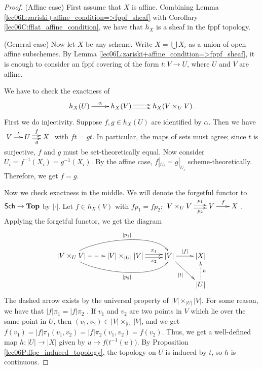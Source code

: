 \begin{proof}
  (Affine case) First assume that $X$ is affine. Combining Lemma
  \ref{lec06L:zariski+affine_condition=>fppf_sheaf} with Corollary
  \ref{lec06C:fflat_affine_condition}, we have that $h_X$ is a sheaf in the fppf
  topology.

  (General case) Now let $X$ be any scheme. Write $X=\bigcup X_i$ as a union of open
  affine subschemes. By Lemma \ref{lec06L:zariski+affine_condition=>fppf_sheaf}, it is
  enough to consider an fppf covering of the form $t:V\to U$, where $U$ and $V$ are
  affine.

  We have to check the exactness of
  \[\xymatrix{
  h_X(U)\ar[r]^\alpha & h_X(V)\ar@<.5ex>[r] \ar@<-.5ex>[r] & h_X(V\times_U V).
  }\]
   First we do injectivity. Suppose $f,g\in h_X(U)$ are identified by $\alpha$. Then we
  have $\xymatrix@-1pc{V\ar[r]^t & U \ar@<.5ex>[r]^f \ar@<-.5ex>[r]_g & X}$ with
  $ft=gt$. In particular, the maps of sets must agree; since $t$ is surjective, $f$ and
  $g$ must be set-theoretically equal. Now consider $U_i=f^{-1}(X_i)=g^{-1}(X_i)$. By
  the affine case, $f|_{U_i}=g|_{U_i}$ scheme-theoretically. Therefore, we get $f=g$.

  Now we check exactness in the middle. We will denote the forgetful functor to $\text{\sf Sch}\to
  \textbf{Top}$ by $|\cdot|$. Let $f\in h_X(V)$ with $fp_1=fp_2$: $\xymatrix@-.5pc{
  V\times_U V \ar@<.5ex>[r]^<>(.5){p_1} \ar@<-.5ex>[r]_<>(.5){p_2} & V\ar[r]^f& X}$.
  Applying the forgetful functor, we get the diagram
  \[\xymatrix{
   |V\times_U V| \ar@{-->}[r] \ar@(ur,u)[rr]^{|p_1|} \ar@(dr,d)[rr]_{|p_2|}
   & |V|\times_{|U|}|V| \ar@<.5ex>[r]^<>(.5){\pi_1} \ar@<-.5ex>[r]_<>(.5){\pi_2}
   & |V| \ar[dr]_{|t|} \ar[r]^{|f|} & |X|\\
   & & & |U|\ar@{.>}[u]_{h}
  }\]
   The dashed arrow exists by the universal property of $|V|\times_{|U|}|V|$. For some
  reason, we have that $|f| \pi_1=|f| \pi_2$ . If $v_1$ and $v_2$ are
  two points in $V$ which lie over the same point in $U$, then $(v_1,v_2)\in
  |V|\times_{|U|}|V|$, and we get $f(v_1)=|f| \pi_1(v_1,v_2)=|f|
  \pi_2(v_1,v_2)=f(v_2)$. Thus, we get a well-defined map $h:|U|\to |X|$ given by
  $u\mapsto f\bigl(t^{-1}(u)\bigr)$. By Proposition \ref{lec06P:ffqc_induced_topology},
  the topology on $U$ is induced by $t$, so $h$ is continuous.


\end{proof}
